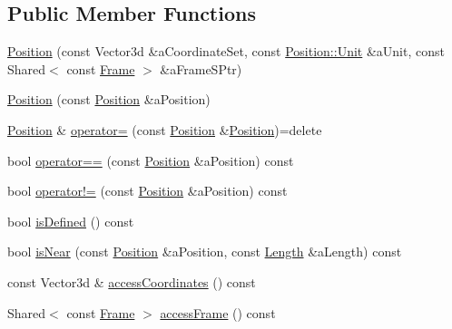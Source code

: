 \subsection*{Public Member Functions}
\begin{DoxyCompactItemize}
\item 
\hyperlink{classlibrary_1_1physics_1_1coord_1_1_position_ac69f2ea85b82a43db1793f7e9cb183f8}{Position} (const Vector3d \&a\+Coordinate\+Set, const \hyperlink{classlibrary_1_1physics_1_1units_1_1_length_a3b8b39cd245cf6b19dc34459baeccb18}{Position\+::\+Unit} \&a\+Unit, const Shared$<$ const \hyperlink{classlibrary_1_1physics_1_1coord_1_1_frame}{Frame} $>$ \&a\+Frame\+S\+Ptr)
\item 
\hyperlink{classlibrary_1_1physics_1_1coord_1_1_position_a8916e7e373ca3f2bd44d7b41b7f2c2aa}{Position} (const \hyperlink{classlibrary_1_1physics_1_1coord_1_1_position}{Position} \&a\+Position)
\item 
\hyperlink{classlibrary_1_1physics_1_1coord_1_1_position}{Position} \& \hyperlink{classlibrary_1_1physics_1_1coord_1_1_position_a5efd032c43ad551922c7ffcd71961090}{operator=} (const \hyperlink{classlibrary_1_1physics_1_1coord_1_1_position}{Position} \&\hyperlink{classlibrary_1_1physics_1_1coord_1_1_position}{Position})=delete
\item 
bool \hyperlink{classlibrary_1_1physics_1_1coord_1_1_position_a520bfdf64e8f45f60e815ebc72012fde}{operator==} (const \hyperlink{classlibrary_1_1physics_1_1coord_1_1_position}{Position} \&a\+Position) const
\item 
bool \hyperlink{classlibrary_1_1physics_1_1coord_1_1_position_a78524e4b9328853ca6266defbe61fc7e}{operator!=} (const \hyperlink{classlibrary_1_1physics_1_1coord_1_1_position}{Position} \&a\+Position) const
\item 
bool \hyperlink{classlibrary_1_1physics_1_1coord_1_1_position_ac13492ffe13b093bb26173089db1a24b}{is\+Defined} () const
\item 
bool \hyperlink{classlibrary_1_1physics_1_1coord_1_1_position_a1fafd3a66e10d748f5a27e13d482acea}{is\+Near} (const \hyperlink{classlibrary_1_1physics_1_1coord_1_1_position}{Position} \&a\+Position, const \hyperlink{classlibrary_1_1physics_1_1units_1_1_length}{Length} \&a\+Length) const
\item 
const Vector3d \& \hyperlink{classlibrary_1_1physics_1_1coord_1_1_position_abbcef57299f3416b88c458ea6bcd24e5}{access\+Coordinates} () const
\item 
Shared$<$ const \hyperlink{classlibrary_1_1physics_1_1coord_1_1_frame}{Frame} $>$ \hyperlink{classlibrary_1_1physics_1_1coord_1_1_position_a26c1f0eba51a3441106367eac1827455}{access\+Frame} () const

\end{DoxyCompactItemize}

